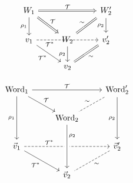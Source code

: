 \documentclass{article}
\begin{document}
\begin{equation}
\begin{tikzcd}[swap]
	W_1 \arrow[Rightarrow]{rr}[swap]{\mathcal{T}} 
	\arrow{d}{\rho_1}
	\arrow[Rightarrow, swap]{dr}{\mathcal{T}}
	& & W_2' \arrow{d}{\rho_2} 
	\arrow[equal]{dl}{\sim} \\
	v_1 \arrow{dr}{\mathcal{T}^*} \arrow[dashed]{rr}{\hspace*{-10ex}\mathcal{T}^*}
	& W_2 \arrow{d}{\rho_2}
	& v_2' \arrow[equal, swap]{dl}{\sim} \\
	& v_2 &
\end{tikzcd}
\end{equation}

\begin{equation}
\begin{tikzcd}[swap]
\mbox{Word}_1 \arrow{rr}[swap]{\mathcal{T}} 
\arrow{dd}{\rho_1}
\arrow[swap]{dr}{\mathcal{T}}
& & \mbox{Word}_2' \arrow{dd}{\rho_2} 
\arrow[-, dashed]{dl}{\sim} \\
& \mbox{Word}_2  & \\
\vec{v}_1 \arrow{dr}{\mathcal{T}^*} \arrow[dashed]{rr}[swap]{\hspace*{-10ex}\mathcal{T}^*}
& & \vec{v}_2' \arrow[-, dashed, swap]{dl}{\sim} \\
& \vec{v}_2 \arrow[leftarrow, crossing over, pos=0.75]{uu}{\rho_2} &
\end{tikzcd}
\end{equation}
\end{document}
